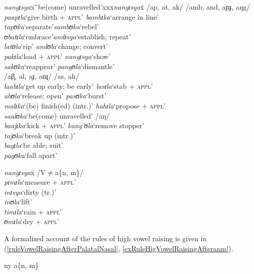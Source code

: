 \begin{exe}
\ex\label{exNoRaisingAC}
\begin{tabbing}
\textit{nangɪsya}x\=`be(come) unravelled'xxx\=\textit{nangɪsya}x\=\kill
/ap, at, ak/ \>\> /amb, and, aɲɟ, aŋg/ \\
\textit{paapɪla}\>`give birth + \textsc{appl}' \> \textit{bambɪka}\>`arrange in line'\\
\textit{tapʊka}\>`separate'\>\textit{sambʊka}\>`rebel'\\
\textit{ʊbatɪla}\>`embrace'\>\textit{andɪsya}\>`establish; repeat'\\
\textit{latʊla}\>`rip' \> \textit{andʊla}\>`change; convert'\\
\textit{pakɪla}\>`load + \textsc{appl}' \> \textit{nangɪsya}\>`show'\\
\textit{sakʊka}\>`reappear' \> \textit{pangʊla}\>`dismantle'\\
/aβ̞, al, aɟ, aɰ/\>\> /as, ah/\\
\textit{laabɪla}\>`get up early; be early' \> \textit{lasɪla}\>`stab + \textsc{appl}'\\
\textit{abʊla}\>`release; open' \> \textit{pasʊka}\>`burst'\\
\textit{malɪka}\>`(be) finish(ed) (intr.)' \> \textit{hahɪla}\>\lq propose + \textsc{appl}'\\
\textit{saalʊka}\>`be(come) unravelled' \> /aŋ/\\
\textit{baajɪka}\>`kick + \textsc{appl}' \> \textit{kang'ʊla}\>`remove stopper'\\
\textit{tajʊka}\>`break up (intr.)' \\
\textit{bagɪla}\>\lq be able; suit'\\
\textit{pagʊka}\>`fall apart'
\end{tabbing}
\ex
\label{exNoRaisingVN}
\begin{tabbing}
\textit{nangɪsya}x\=\kill
/V$\neq$a\{n, m\}/\\
\textit{pɪmɪla}\>\lq measure + \textsc{appl}'\\
\textit{inɪsya}\>\lq dirty (tr.)'\\
\textit{inʊla}\>\lq lift'\\
\textit{timɪla}\>\lq rain + \textsc{appl}'\\
\textit{ʊmɪla}\>\lq dry + \textsc{appl}'
\end{tabbing}
\end{exe}

A formalized account of the rules of high vowel raising is given in (\ref{ruleVowelRaisingAfterPalatalNasal}, \ref{exRuleHigVowelRaisingAfteranm}).
\begin{exe}
\ex \label{ruleVowelRaisingAfterPalatalNasal}
	{
	}
	{ny}
\ex \label{exRuleHigVowelRaisingAfteranm}
	{}
{a\{n, m\}}
\end{exe}

